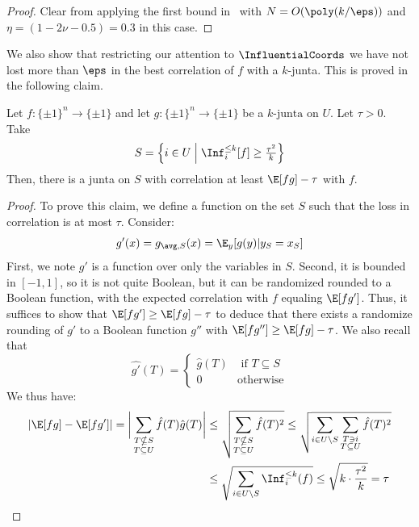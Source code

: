 \begin{proof}
Clear from applying the first bound in~ with $N = O(\poly(k/\eps))$ and  $\eta =(1-2\nu-0.5) = 0.3$ in this case.
\end{proof}


We also show that restricting our attention to $\InfluentialCoords$ we have not lost more than $\eps$ in the best correlation of $f$ with a $k$-junta. This is proved in the following claim.
\begin{claim}
\label{claim:improved-junta-corr}
    Let $f: \{\pm 1 \}^n \to \{\pm 1\}$ and let $g: \{\pm 1\}^n \to \{\pm 1\}$ be a $k\text{-junta}$ on $U$.
    Let $\tau >0$. Take $$S= \left\{i \in U\; \middle\vert\; \Inf_i^{\leq k}[f] \geq \tfrac{\tau^2}{k}\right\}$$
    Then, there is a junta on $S$ with correlation at least $\E[fg] - \tau$ with $f$.
\end{claim}


\begin{proof}
To prove this claim, we define a function on the set $S$ such that the loss in correlation is at most $\tau$. Consider:
$$g'(x) = g_{\avg,S}(x) =  \E_y[g(y)|y_S = x_S]$$
First, we note $g'$ is a function over only the variables in $S$. Second, it is bounded in $[-1,1]$, so it is not quite Boolean, but it can be randomized rounded to a Boolean function, with the expected correlation with $f$ equaling $\E[fg']$. Thus, it suffices to show that $\E[fg'] \ge \E[fg]-\tau$ to deduce that there exists a randomize rounding of $g'$ to a Boolean function $g''$ with $\E[f g''] \ge \E[fg]-\tau$. We also recall that 
\[
\hat{g'}(T) = \begin{cases}
\hat{g}(T) & \text{ if } T \subseteq S \\
0 & \text{otherwise}
\end{cases}
\]
We thus have:
\begin{align*}
    \left| \E[fg] - \E[fg']\right| = \bigg|  \sum_{\substack{T\nsubseteq S \\ T \subseteq U}} \hat{f}(T)\hat{g}(T)\bigg|
    &\leq \sqrt{\sum_{\substack{T\nsubseteq S \\ T \subseteq U}} \hat{f}(T)^2} 
    \leq \sqrt{\sum_{i\in U\setminus S} \sum_{\substack{T \ni i \\ T \subseteq U}} \hat{f}(T)^2} \\
    &\leq \sqrt{\sum_{i\in U\setminus S}\Inf_i^{\leq k}(f)}
    \leq \sqrt{k \cdot \frac{\tau^2}{k}} = \tau \qedhere
\end{align*}
\end{proof}


